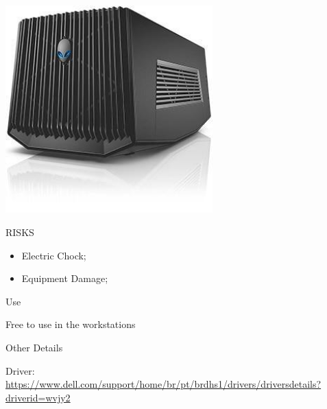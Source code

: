 \begin{multicols}{2}

\includegraphics[width=80mm, keepaspectratio]{imgs/aga.jpg}

\columnbreak

\begin{mdframed}[roundcorner=10pt, linecolor=red, linewidth=2pt]
\vspace{1em}
{\Large {\color{red}RISKS}}
\vspace{1em}

\begin{itemize}
    \item Electric Chock;
    \item Equipment Damage;
\end{itemize}

\vspace{1em}
\end{mdframed}

\vspace{2em}

{\Large Use}
\vspace{1em}

Free to use in the workstations
\end{multicols}

{\Large Other Details}
\vspace{1em}

Driver: \url{https://www.dell.com/support/home/br/pt/brdhs1/drivers/driversdetails?driverid=wvjy2}

\newpage

